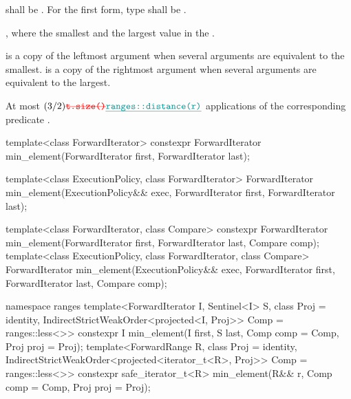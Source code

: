\begin{itemdescr}
\pnum
\requires
{}  shall be  .
For the first form, type  shall be .

\pnum
\returns {}
,
where    the smallest  and    the
largest value in the  .

\begin{removedblock}
\pnum
\remarks {} is a copy of the leftmost argument when several arguments are equivalent to
the smallest.  is a copy of the rightmost argument when several arguments are
equivalent to the largest.
\end{removedblock}

\pnum
\complexity At most
$(3/2)\tcode{\removed{t.size()}\added{ranges::distance(r)}}$ applications of
the corresponding predicate
.
\end{itemdescr}


%
\begin{itemdecl}
template<class ForwardIterator>
  constexpr ForwardIterator min_element(ForwardIterator first, ForwardIterator last);

template<class ExecutionPolicy, class ForwardIterator>
  ForwardIterator min_element(ExecutionPolicy&& exec,
                              ForwardIterator first, ForwardIterator last);

template<class ForwardIterator, class Compare>
  constexpr ForwardIterator min_element(ForwardIterator first, ForwardIterator last,
                                        Compare comp);
template<class ExecutionPolicy, class ForwardIterator, class Compare>
  ForwardIterator min_element(ExecutionPolicy&& exec,
                              ForwardIterator first, ForwardIterator last,
                              Compare comp);
\end{itemdecl}
\begin{addedblock}
\begin{itemdecl}
namespace ranges {
  template<ForwardIterator I, Sentinel<I> S, class Proj = identity,
      IndirectStrictWeakOrder<projected<I, Proj>> Comp = ranges::less<>>
    constexpr I min_element(I first, S last, Comp comp = Comp{}, Proj proj = Proj{});
  template<ForwardRange R, class Proj = identity,
      IndirectStrictWeakOrder<projected<iterator_t<R>, Proj>> Comp = ranges::less<>>
    constexpr safe_iterator_t<R>
      min_element(R&& r, Comp comp = Comp{}, Proj proj = Proj{});
}
\end{itemdecl}
\end{addedblock}

